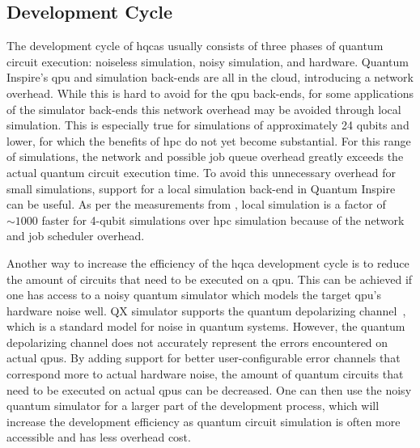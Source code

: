 \subsection{Development Cycle}
The development cycle of \glspl{hqca} usually consists of three phases of quantum circuit execution: noiseless simulation, noisy simulation, and hardware.
Quantum Inspire's \gls{qpu} and simulation back-ends are all in the cloud, introducing a network overhead.
While this is hard to avoid for the \gls{qpu} back-ends, for some applications of the simulator back-ends this network overhead may be avoided through local simulation.
This is especially true for simulations of approximately 24 qubits and lower, for which the benefits of \gls{hpc} do not yet become substantial.
For this range of simulations, the network and possible job queue overhead greatly exceeds the actual quantum circuit execution time.
To avoid this unnecessary overhead for small simulations, support for a local simulation back-end in Quantum Inspire can be useful.
As per the measurements from , local simulation is a factor of $\sim1000$ faster for 4-qubit simulations over \gls{hpc} simulation because of the network and job scheduler overhead.

Another way to increase the efficiency of the \gls{hqca} development cycle is to reduce the amount of circuits that need to be executed on a \gls{qpu}.
This can be achieved if one has access to a noisy quantum simulator which models the target \gls{qpu}'s hardware noise well.
QX simulator supports the quantum depolarizing channel~\cite[Section 8.3.4]{nielsen2002quantum}, which is a standard model for noise in quantum systems.
However, the quantum depolarizing channel does not accurately represent the errors encountered on actual \glspl{qpu}.
By adding support for better user-configurable error channels that correspond more to actual hardware noise, the amount of quantum circuits that need to be executed on actual \glspl{qpu} can be decreased.
One can then use the noisy quantum simulator for a larger part of the development process, which will increase the development efficiency as quantum circuit simulation is often more accessible and has less overhead cost.

